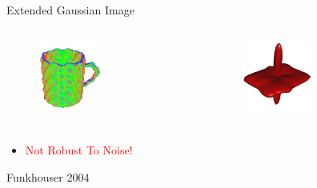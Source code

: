 \documentclass{beamer}
\begin{document}
\begin{frame}{Extended Gaussian Image}

\begin{columns}[c]

\begin{figure}[t]
    \includegraphics[width=0.5\textwidth]{NoiseCoffeeMug.png}
\end{figure}

\begin{figure}[t]
    \includegraphics[width=0.5\textwidth]{EGINoiseCoffeeMug.png}
\end{figure}

\end{columns}

\begin{itemize}[label=$\vartriangleright$]

\item \textcolor{red}{Not Robust To Noise!}

\end{itemize}

\small Funkhouser 2004

\end{frame}
\end{document}
